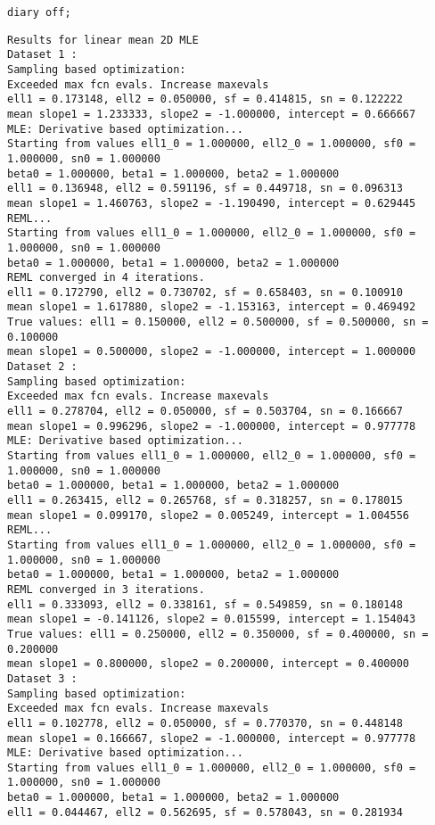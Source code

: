 \begin{verbatim}
diary off;
\end{verbatim}

        \color{lightgray} \begin{verbatim}
Results for linear mean 2D MLE
Dataset 1 : 
Sampling based optimization:
Exceeded max fcn evals. Increase maxevals
ell1 = 0.173148, ell2 = 0.050000, sf = 0.414815, sn = 0.122222 
mean slope1 = 1.233333, slope2 = -1.000000, intercept = 0.666667 
MLE: Derivative based optimization...
Starting from values ell1_0 = 1.000000, ell2_0 = 1.000000, sf0 = 1.000000, sn0 = 1.000000 
beta0 = 1.000000, beta1 = 1.000000, beta2 = 1.000000 
ell1 = 0.136948, ell2 = 0.591196, sf = 0.449718, sn = 0.096313 
mean slope1 = 1.460763, slope2 = -1.190490, intercept = 0.629445 
REML...
Starting from values ell1_0 = 1.000000, ell2_0 = 1.000000, sf0 = 1.000000, sn0 = 1.000000 
beta0 = 1.000000, beta1 = 1.000000, beta2 = 1.000000 
REML converged in 4 iterations. 
ell1 = 0.172790, ell2 = 0.730702, sf = 0.658403, sn = 0.100910 
mean slope1 = 1.617880, slope2 = -1.153163, intercept = 0.469492 
True values: ell1 = 0.150000, ell2 = 0.500000, sf = 0.500000, sn = 0.100000 
mean slope1 = 0.500000, slope2 = -1.000000, intercept = 1.000000 
Dataset 2 : 
Sampling based optimization:
Exceeded max fcn evals. Increase maxevals
ell1 = 0.278704, ell2 = 0.050000, sf = 0.503704, sn = 0.166667 
mean slope1 = 0.996296, slope2 = -1.000000, intercept = 0.977778 
MLE: Derivative based optimization...
Starting from values ell1_0 = 1.000000, ell2_0 = 1.000000, sf0 = 1.000000, sn0 = 1.000000 
beta0 = 1.000000, beta1 = 1.000000, beta2 = 1.000000 
ell1 = 0.263415, ell2 = 0.265768, sf = 0.318257, sn = 0.178015 
mean slope1 = 0.099170, slope2 = 0.005249, intercept = 1.004556 
REML...
Starting from values ell1_0 = 1.000000, ell2_0 = 1.000000, sf0 = 1.000000, sn0 = 1.000000 
beta0 = 1.000000, beta1 = 1.000000, beta2 = 1.000000 
REML converged in 3 iterations. 
ell1 = 0.333093, ell2 = 0.338161, sf = 0.549859, sn = 0.180148 
mean slope1 = -0.141126, slope2 = 0.015599, intercept = 1.154043 
True values: ell1 = 0.250000, ell2 = 0.350000, sf = 0.400000, sn = 0.200000 
mean slope1 = 0.800000, slope2 = 0.200000, intercept = 0.400000 
Dataset 3 : 
Sampling based optimization:
Exceeded max fcn evals. Increase maxevals
ell1 = 0.102778, ell2 = 0.050000, sf = 0.770370, sn = 0.448148 
mean slope1 = 0.166667, slope2 = -1.000000, intercept = 0.977778 
MLE: Derivative based optimization...
Starting from values ell1_0 = 1.000000, ell2_0 = 1.000000, sf0 = 1.000000, sn0 = 1.000000 
beta0 = 1.000000, beta1 = 1.000000, beta2 = 1.000000 
ell1 = 0.044467, ell2 = 0.562695, sf = 0.578043, sn = 0.281934 

\end{verbatim}
